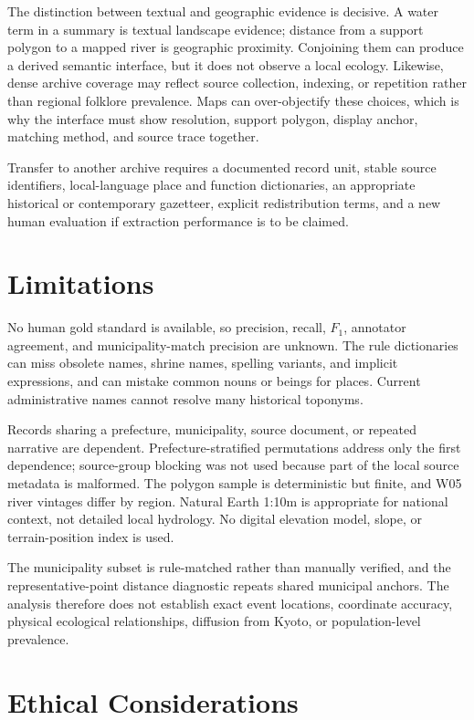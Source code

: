 \documentclass[9pt,twocolumn,a4paper]{extarticle}
\begin{document}
The distinction between textual and geographic evidence is decisive. A water term in a summary is textual landscape evidence; distance from a support polygon to a mapped river is geographic proximity. Conjoining them can produce a derived semantic interface, but it does not observe a local ecology. Likewise, dense archive coverage may reflect source collection, indexing, or repetition rather than regional folklore prevalence. Maps can over-objectify these choices, which is why the interface must show resolution, support polygon, display anchor, matching method, and source trace together.

Transfer to another archive requires a documented record unit, stable source identifiers, local-language place and function dictionaries, an appropriate historical or contemporary gazetteer, explicit redistribution terms, and a new human evaluation if extraction performance is to be claimed.

\section{Limitations}

No human gold standard is available, so precision, recall, \(F_1\), annotator agreement, and municipality-match precision are unknown. The rule dictionaries can miss obsolete names, shrine names, spelling variants, and implicit expressions, and can mistake common nouns or beings for places. Current administrative names cannot resolve many historical toponyms.

Records sharing a prefecture, municipality, source document, or repeated narrative are dependent. Prefecture-stratified permutations address only the first dependence; source-group blocking was not used because part of the local source metadata is malformed. The polygon sample is deterministic but finite, and W05 river vintages differ by region. Natural Earth 1:10m is appropriate for national context, not detailed local hydrology. No digital elevation model, slope, or terrain-position index is used.

The municipality subset is rule-matched rather than manually verified, and the representative-point distance diagnostic repeats shared municipal anchors. The analysis therefore does not establish exact event locations, coordinate accuracy, physical ecological relationships, diffusion from Kyoto, or population-level prevalence.

\section{Ethical Considerations}
\end{document}
